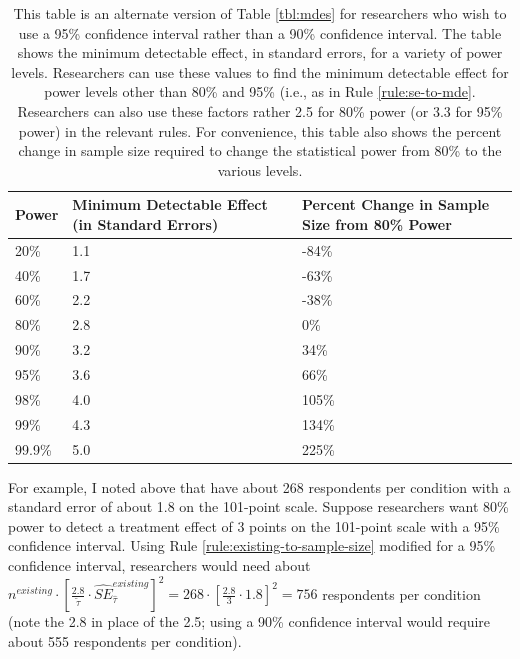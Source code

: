 \documentclass[12pt]{article}
\begin{document}
\begin{table}[h]
\centering
\caption{This table is an alternate version of Table \ref{tbl:mdes} for researchers who wish to use a 95\% confidence interval rather than a 90\% confidence interval. The table shows the minimum detectable effect, in standard errors, for a variety of power levels. Researchers can use these values to find the minimum detectable effect for power levels other than 80\% and 95\% (i.e., as in Rule \ref{rule:se-to-mde}. Researchers can also use these factors rather 2.5 for 80\% power (or 3.3 for 95\% power) in the relevant rules. For convenience, this table also shows the percent change in sample size required to change the statistical power from 80\% to the various levels.}\label{tbl:mdes2}
\footnotesize %
\renewcommand{\tabularxcolumn}[1]{>{\centering\arraybackslash}m{#1}} %
\setlength{\extrarowheight}{4pt} %
\begin{tabularx}{\linewidth}{|X|X|X|} %
\hline
\textbf{Power} & \textbf{Minimum Detectable Effect (in Standard Errors)} & \textbf{Percent Change in Sample Size from 80\% Power} \\
\hline
20\%   & 1.1 & -84\% \\
\hline
40\%   & 1.7 & -63\% \\
\hline
60\%   & 2.2 & -38\% \\
\hline
80\%   & 2.8 & 0\% \\
\hline
90\%   & 3.2 & 34\% \\
\hline
95\%   & 3.6 & 66\% \\
\hline
98\%   & 4.0 & 105\% \\
\hline
99\%   & 4.3 & 134\% \\
\hline
99.9\%  & 5.0 & 225\% \\
\hline
\end{tabularx}
\end{table}

For example, I noted above that \cite{Ahler2018} have about 268 respondents per condition with a standard error of about 1.8 on the 101-point scale. 
Suppose researchers want 80\% power to detect a treatment effect of 3 points on the 101-point scale with a 95\% confidence interval.
Using Rule \ref{rule:existing-to-sample-size} modified for a 95\% confidence interval, researchers would need about $n^{existing} \cdot \left\lbrack \frac{2.8}{\widetilde{\tau}} \cdot {\widehat{SE}}_{\widehat{\tau}}^{existing} \right\rbrack^{2} = 268 \cdot \left\lbrack \frac{2.8}{3} \cdot 1.8 \right\rbrack^{2} = 756$ respondents per condition (note the 2.8 in place of the 2.5; using a 90\% confidence interval would require about 555 respondents per condition).
\end{document}
